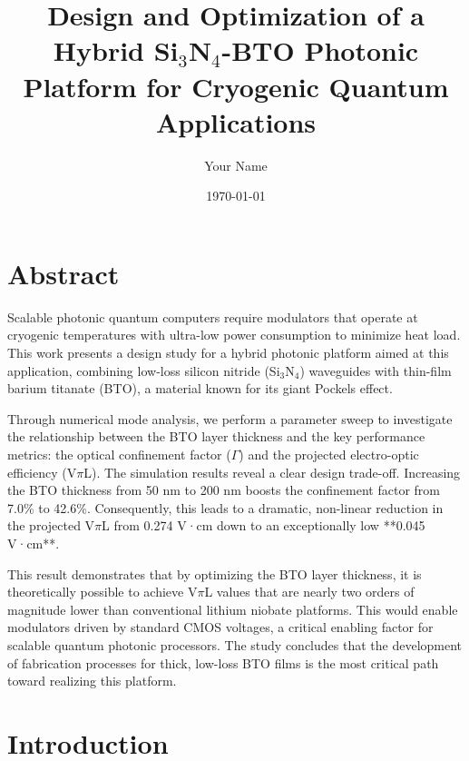 \documentclass[12pt, a4paper, numbers]{report}
\title{Design and Optimization of a Hybrid Si$_3$N$_4$-BTO Photonic Platform for Cryogenic Quantum Applications}
\author{Your Name}
\date{\today}
\begin{document}

\maketitle
\tableofcontents
\listoffigures
\listoftables

\chapter*{Abstract}
Scalable photonic quantum computers require modulators that operate at cryogenic temperatures with ultra-low power consumption to minimize heat load. This work presents a design study for a hybrid photonic platform aimed at this application, combining low-loss silicon nitride (Si$_3$N$_4$) waveguides with thin-film barium titanate (BTO), a material known for its giant Pockels effect.

Through numerical mode analysis, we perform a parameter sweep to investigate the relationship between the BTO layer thickness and the key performance metrics: the optical confinement factor ($\Gamma$) and the projected electro-optic efficiency (V$\pi$L). The simulation results reveal a clear design trade-off. Increasing the BTO thickness from 50 nm to 200 nm boosts the confinement factor from 7.0\% to 42.6\%. Consequently, this leads to a dramatic, non-linear reduction in the projected V$\pi$L from 0.274 V·cm down to an exceptionally low **0.045 V·cm**.

This result demonstrates that by optimizing the BTO layer thickness, it is theoretically possible to achieve V$\pi$L values that are nearly two orders of magnitude lower than conventional lithium niobate platforms. This would enable modulators driven by standard CMOS voltages, a critical enabling factor for scalable quantum photonic processors. The study concludes that the development of fabrication processes for thick, low-loss BTO films is the most critical path toward realizing this platform.

\chapter{Introduction}
\end{document}
